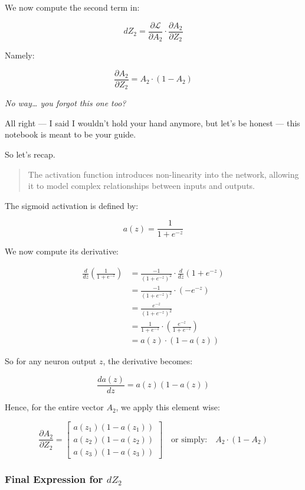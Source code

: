 \documentclass[11pt]{article}
\begin{document}
We now compute the second term in:

\[
dZ_2 = \frac{\partial \mathcal{L}}{\partial A_2} \cdot \frac{\partial A_2}{\partial Z_2}
\]

Namely:

\[
\frac{\partial A_2}{\partial Z_2} = A_2 \cdot (1 - A_2)
\]

\textit{No way… you forgot this one too?}

All right — I said I wouldn’t hold your hand anymore,  
but let’s be honest — this notebook is meant to be your guide.

So let’s recap.

\begin{quote}
The activation function introduces non-linearity into the network,  
allowing it to model complex relationships between inputs and outputs.
\end{quote}

The sigmoid activation is defined by:

\[
a(z) = \frac{1}{1 + e^{-z}}
\]

We now compute its derivative:

\[
\begin{aligned}
\frac{d}{dz} \left( \frac{1}{1 + e^{-z}} \right)
&= \frac{-1}{(1 + e^{-z})^2} \cdot \frac{d}{dz}(1 + e^{-z}) \\
&= \frac{-1}{(1 + e^{-z})^2} \cdot (-e^{-z}) \\
&= \frac{e^{-z}}{(1 + e^{-z})^2} \\
&= \frac{1}{1 + e^{-z}} \cdot \left( \frac{e^{-z}}{1 + e^{-z}} \right) \\
&= a(z) \cdot (1 - a(z))
\end{aligned}
\]

So for any neuron output \( z \), the derivative becomes:

\[
\boxed{
\frac{da(z)}{dz} = a(z)(1 - a(z))
}
\]

Hence, for the entire vector \( A_2 \), we apply this element wise:

\[
\frac{\partial A_2}{\partial Z_2} =
\begin{bmatrix}
a(z_1)(1 - a(z_1)) \\
a(z_2)(1 - a(z_2)) \\
a(z_3)(1 - a(z_3))
\end{bmatrix}
\quad \text{or simply:} \quad
A_2 \cdot (1 - A_2)
\]

\subsubsection{Final Expression for $dZ_2$}
\end{document}
